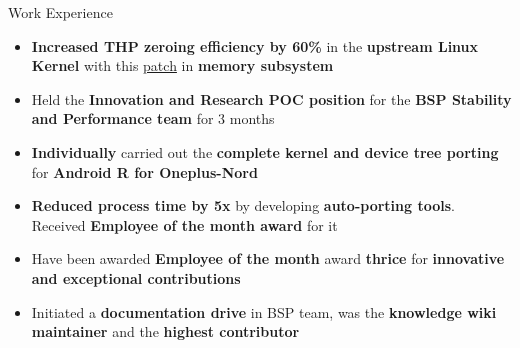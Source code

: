 \begin{rSection}{Work Experience}
	\def \mmpatchurl{https://git.kernel.org/pub/scm/linux/kernel/git/torvalds/linux.git/commit/?id=d2c20e51e3966bc668ef1ef21fbe90704286c8d0}

\begin{itemize}[leftmargin=*]

	\itemsep \sepval

	\item {\bf Increased THP zeroing efficiency by 60\%} in the {\bf upstream
		Linux Kernel} with this \href{\mmpatchurl}{patch} in {\bf memory subsystem}

	\item Held the {\bf Innovation and Research POC position} for the {\bf BSP Stability
		and Performance team} for 3 months
	
	\item {\bf Individually} carried out the {\bf complete kernel and device tree
		porting} for {\bf Android R for Oneplus-Nord}
	
	\item {\bf Reduced process time by 5x} by developing {\bf auto-porting tools}. Received {\bf Employee of the month award} for
		it
		
	\item Have been awarded {\bf Employee of the month} award {\bf thrice} for {\bf innovative and exceptional
		contributions}

	\item Initiated a {\bf documentation drive} in BSP team, was the
		{\bf knowledge wiki maintainer} and the {\bf highest
		contributor}

\end{itemize}

\end{rSection}
